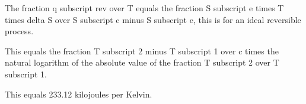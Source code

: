The fraction q subscript rev over T equals the fraction S subscript e times T times delta S over S subscript c minus S subscript e, this is for an ideal reversible process.

This equals the fraction T subscript 2 minus T subscript 1 over c times the natural logarithm of the absolute value of the fraction T subscript 2 over T subscript 1.

This equals 233.12 kilojoules per Kelvin.